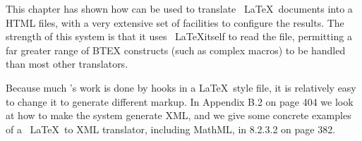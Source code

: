 
This chapter has shown how \texht can be used to translate \ \LaTeX\  documents 
into a HTML files, with a very extensive set of facilities to configure the results. 
The strength of this system is that it uses \ \LaTeX itself to read the file, permitting a 
far greater range of BTEX constructs (such as complex macros) to be handled than 
most other translators. 

Because much \texht's work is done by hooks in a  \LaTeX\ style file, it
is relatively easy to change it to generate different markup. In
Appendix B.2 on page 404 we look at how to make the system generate XML,
and we give some concrete examples of a \ \LaTeX\  to XML translator,
including MathML, in 8.2.3.2 on page 382. 
